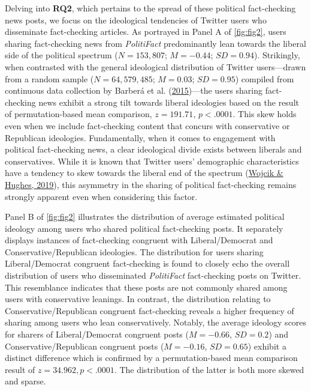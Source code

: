 \documentclass[
  12pt,
]{article}
\begin{document}
Delving into \textbf{RQ2}, which pertains to the spread of these
political fact-checking news posts, we focus on the ideological
tendencies of Twitter users who disseminate fact-checking articles. As
portrayed in Panel A of \autoref{fig:fig2}, users sharing fact-checking
news from \emph{PolitiFact} predominantly lean towards the liberal side
of the political spectrum (\(N = 153,807\); \(M = -0.44\);
\(SD = 0.94\)). Strikingly, when contrasted with the general ideological
distribution of Twitter users---drawn from a random sample
(\(N = 64,579,485\); \(M = 0.03\); \(SD = 0.95\)) compiled from
continuous data collection by Barberá et al.
(\protect\hyperlink{ref-barbera2015tweeting}{2015})---the users sharing
fact-checking news exhibit a strong tilt towards liberal ideologies
based on the result of permutation-based mean comparison,
\(z = 191.71\), \(p < .0001\). This skew holds even when we include
fact-checking content that concurs with conservative or Republican
ideologies. Fundamentally, when it comes to engagement with political
fact-checking news, a clear ideological divide exists between liberals
and conservatives. While it is known that Twitter users' demographic
characteristics have a tendency to skew towards the liberal end of the
spectrum (\protect\hyperlink{ref-wojcik2019sizing}{Wojcik \& Hughes,
2019}), this asymmetry in the sharing of political fact-checking remains
strongly apparent even when considering this factor.

Panel B of \autoref{fig:fig2} illustrates the distribution of average
estimated political ideology among users who shared political
fact-checking posts. It separately displays instances of fact-checking
congruent with Liberal/Democrat and Conservative/Republican ideologies.
The distribution for users sharing Liberal/Democrat congruent
fact-checking is found to closely echo the overall distribution of users
who disseminated \emph{PolitiFact} fact-checking posts on Twitter. This
resemblance indicates that these posts are not commonly shared among
users with conservative leanings. In contrast, the distribution relating
to Conservative/Republican congruent fact-checking reveals a higher
frequency of sharing among users who lean conservatively. Notably, the
average ideology scores for sharers of Liberal/Democrat congruent posts
(\(M = -0.66\), \(SD = 0.2\)) and Conservative/Republican congruent
posts (\(M = -0.16\), \(SD = 0.65\)) exhibit a distinct difference which
is confirmed by a permutation-based mean comparison result of
\(z = 34.962, p< .0001\). The distribution of the latter is both more
skewed and sparse.
\end{document}
